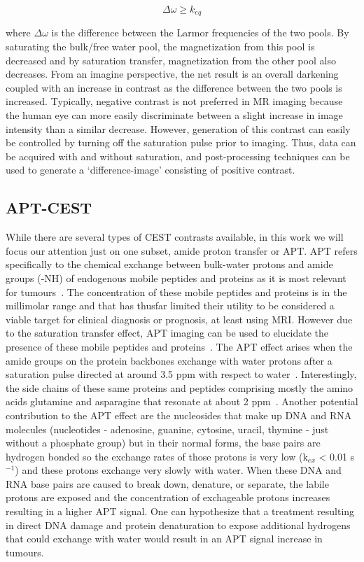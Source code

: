 	\begin{equation}
		\Delta \omega \geq k_{eq}
	\end{equation}

where $\Delta \omega$ is the difference between the Larmor frequencies of the two pools.
By saturating the bulk/free water pool, the magnetization from this pool is decreased and by saturation transfer, magnetization from the other pool also decreases.
From an imagine perspective, the net result is an overall darkening coupled with an increase in contrast as the difference between the two pools is increased.
Typically, negative contrast is not preferred in MR imaging because the human eye can more easily discriminate between a slight increase in image intensity than a similar decrease.
However, generation of this contrast can easily be controlled by turning off the saturation pulse prior to imaging.
Thus, data can be acquired with and without saturation, and post-processing techniques can be used to generate a `difference-image' consisting of positive contrast.

\subsection{APT-CEST}     

While there are several types of CEST contrasts available, in this
work we will focus our attention just on one subset, amide proton transfer or APT.
APT refers specifically to the chemical exchange between bulk-water protons and amide groups (-NH) of endogenous mobile peptides and proteins as it is most relevant for tumours~\cite{Togao:2013gn}.
The concentration of these mobile peptides and proteins is in the millimolar range and that has thusfar limited their utility to be considered a viable target for clinical diagnosis or prognosis, at least using MRI.
However due to the saturation transfer effect, APT imaging can be used to elucidate the presence of these mobile peptides and proteins~\cite{Zhou:2003cc}.
The APT effect arises when the amide groups on the protein backbones exchange with water protons after a saturation pulse directed at around 3.5 ppm with respect to water~\cite{vanZijl:2003in}.
Interestingly, the side chains of these same proteins and peptides comprising mostly the amino acids glutamine and asparagine that
resonate at about 2 ppm~\cite{vanZijl:2003in}.
Another potential contribution to the APT effect are the nucleosides that make up DNA and RNA molecules (nucleotides - adenosine, guanine, cytosine, uracil, thymine -  just without a phosphate group) but in their normal forms, the base pairs are hydrogen bonded so the exchange rates of those protons is very low (k$_{ex}$ < 0.01 s$^{-1}$) and these protons exchange very slowly with water.
When these DNA and RNA base pairs are caused to break down, denature, or separate, the labile protons are exposed and the concentration of exchageable protons increases resulting in a higher APT signal.
One can hypothesize that a treatment resulting in direct DNA damage and protein denaturation to expose additional hydrogens that could exchange with water would result in an APT signal increase in tumours.

